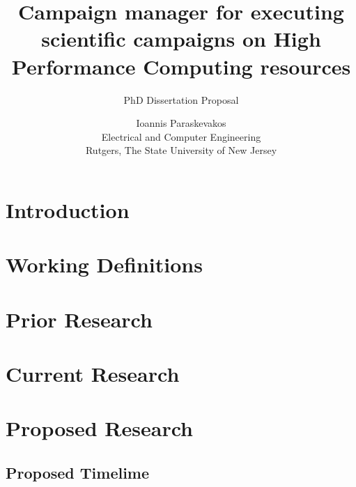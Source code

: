 

\title{Campaign manager for executing scientific campaigns on High Performance Computing resources}
\subtitle{PhD Dissertation Proposal}
\author{Ioannis Paraskevakos \\	Electrical and Computer Engineering \\
        Rutgers, The State University of New Jersey}
\date{}

\maketitle


\section{Introduction}


\section{Working Definitions}


\section{Prior Research}


\section{Current Research}


\section{Proposed Research}


\subsection{Proposed Timelime}




